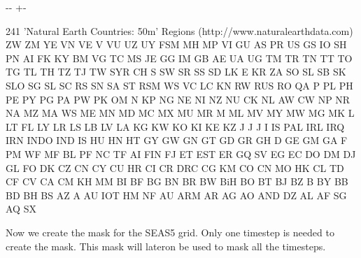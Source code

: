 \documentclass[letterpaper,10pt,english]{sphinxmanual}
\newlength\nbsphinxcodecellspacing
\begin{document}
{

\kern-\sphinxverbatimsmallskipamount\kern-\baselineskip
\kern+\FrameHeightAdjust\kern-\fboxrule
\vspace{\nbsphinxcodecellspacing}

\begin{sphinxVerbatim}[commandchars=\\\{\}]
\llap{\color{nbsphinxout}[7]:\,\hspace{\fboxrule}\hspace{\fboxsep}}241 'Natural Earth Countries: 50m' Regions (http://www.naturalearthdata.com)
ZW ZM YE VN VE V VU UZ UY FSM MH MP VI GU AS PR US GS IO SH PN AI FK KY BM VG TC MS JE GG IM GB AE UA UG TM TR TN TT TO TG TL TH TZ TJ TW SYR CH S SW SR SS SD LK E KR ZA SO SL SB SK SLO SG SL SC RS SN SA ST RSM WS VC LC KN RW RUS RO QA P PL PH PE PY PG PA PW PK OM N KP NG NE NI NZ NU CK NL AW CW NP NR NA MZ MA WS ME MN MD MC MX MU MR M ML MV MY MW MG MK L LT FL LY LR LS LB LV LA KG KW KO KI KE KZ J J J I IS PAL IRL IRQ IRN INDO IND IS HU HN HT GY GW GN GT GD GR GH D GE GM GA F PM WF MF BL PF NC TF AI FIN FJ ET EST ER GQ SV EG EC DO DM DJ GL FO DK CZ CN CY CU HR CI CR DRC CG KM CO CN MO HK CL TD CF CV CA CM KH MM BI BF BG BN BR BW BiH BO BT BJ BZ B BY BB BD BH BS AZ A AU IOT HM NF AU ARM AR AG AO AND DZ AL AF SG AQ SX
\end{sphinxVerbatim}
}

Now we create the mask for the SEAS5 grid. Only one timestep is needed to create the mask. This mask will lateron be used to mask all the timesteps.

{
\begin{sphinxVerbatim}[commandchars=\\\{\}]
\llap{\color{nbsphinxin}[8]:\,\hspace{\fboxrule}\hspace{\fboxsep}}    
\end{sphinxVerbatim}
}
\end{document}
